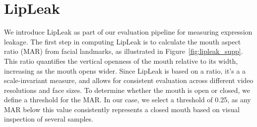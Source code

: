 \begin{table}[ht]
\centering
{}
\caption{\textbf{Default model hyperparameters and training configurations.}}
\label{tab:model_params}
\end{table}


\section{LipLeak}

We introduce LipLeak as part of our evaluation pipeline for measuring expression leakage. The first step in computing LipLeak is to calculate the mouth aspect ratio (MAR) from facial landmarks, as illustrated in Figure~\ref{fig:lipleak_supp}. This ratio quantifies the vertical openness of the mouth relative to its width, increasing as the mouth opens wider. Since LipLeak is based on a ratio, it's a a scale-invariant measure, and allows for consistent evaluation across different video resolutions and face sizes. To determine whether the mouth is open or closed, we define a threshold for the MAR. In our case, we select a threshold of 0.25, as any MAR below this value consistently represents a closed mouth based on visual inspection of several samples.

